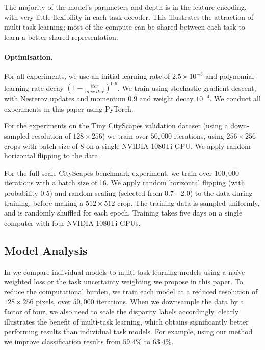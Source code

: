 The majority of the model's parameters and depth is in the feature encoding, with very little flexibility in each task decoder. This illustrates the attraction of multi-task learning; most of the compute can be shared between each task to learn a better shared representation.

\paragraph{Optimisation.}
For all experiments, we use an initial learning rate of $2.5\times10^{-3}$ and polynomial learning rate decay $(1-\frac{iter}{max~iter})^{0.9}$. We train using stochastic gradient descent, with Nesterov updates and momentum $0.9$ and weight decay $10^{-4}$. We conduct all experiments in this paper using PyTorch.

For the experiments on the Tiny CityScapes validation dataset (using a down-sampled resolution of $128\times256$) we train over $50,000$ iterations, using $256 \times 256$ crops with batch size of 8 on a single NVIDIA 1080Ti GPU. We apply random horizontal flipping to the data.

For the full-scale CityScapes benchmark experiment, we train over $100,000$ iterations with a batch size of 16. We apply random horizontal flipping (with probability 0.5) and random scaling (selected from 0.7 - 2.0) to the data during training, before making a $512 \times 512$ crop. The training data is sampled uniformly, and is randomly shuffled for each epoch. Training takes five days on a single computer with four NVIDIA 1080Ti GPUs.

\subsection{Model Analysis}
\label{sec:tasks}

In  we compare individual models to multi-task learning models using a na{\"i}ve weighted loss or the task uncertainty weighting we propose in this paper. To reduce the computational burden, we train each model at a reduced resolution of $128\times256$ pixels, over $50,000$ iterations. When we downsample the data by a factor of four, we also need to scale the disparity labels accordingly.  clearly illustrates the benefit of multi-task learning, which obtains significantly better performing results than individual task models. For example, using our method we improve classification results from $59.4\%$ to $63.4\%$.

